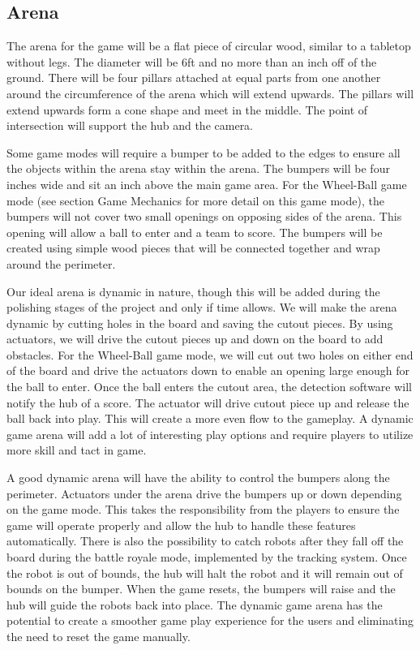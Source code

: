 \documentclass[11pt]{ieeeconf}
\begin{document}
\subsection{Arena}

The arena for the game will be a flat piece of circular wood, similar to a tabletop without legs. The diameter will be 6ft and no more than an inch off of the ground. There will be four pillars attached at equal parts from one another around the circumference of the arena which will extend upwards. The pillars will extend upwards form a cone shape and meet in the middle. The point of intersection will support the hub and the camera. 

Some game modes will require a bumper to be added to the edges to ensure all the objects within the arena stay within the arena. The bumpers will be four inches wide and sit an inch above the main game area. For the Wheel-Ball game mode (see section Game Mechanics for more detail on this game mode), the bumpers will not cover two small openings on opposing sides of the arena. This opening will allow a ball to enter and a team to score. The bumpers will be created using simple wood pieces that will be connected together and wrap around the perimeter. 

Our ideal arena is dynamic in nature, though this will be added during the polishing stages of the project and only if time allows. We will make the arena dynamic by cutting holes in the board and saving the cutout pieces. By using actuators, we will drive the cutout pieces up and down on the board to add obstacles. For the Wheel-Ball game mode, we will cut out two holes on either end of the board and drive the actuators down to enable an opening large enough for the ball to enter. Once the ball enters the cutout area, the detection software will notify the hub of a score. The actuator will drive cutout piece up and release the ball back into play. This will create a more even flow to the gameplay. A dynamic game arena will add a lot of interesting play options and require players to utilize more skill and tact in game.

A good dynamic arena will have the ability to control the bumpers along the perimeter. Actuators under the arena drive the bumpers up or down depending on the game mode. This takes the responsibility from the players to ensure the game will operate properly and allow the hub to handle these features automatically. There is also the possibility to catch robots after they fall off the board during the battle royale mode, implemented by the tracking system. Once the robot is out of bounds, the hub will halt the robot and it will remain out of bounds on the bumper. When the game resets, the bumpers will raise and the hub will guide the robots back into place. The dynamic game arena has the potential to create a smoother game play experience for the users and eliminating the need to reset the game manually. 
\end{document}
